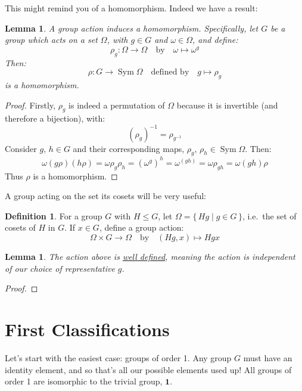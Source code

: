 \documentclass[a4paper, oneside, 12pt, final]{article}
\renewcommand{\emph}{\underline}
\newtheorem{lemma}[theorem]{Lemma}
\theoremstyle{definition}
\newtheorem{definition}[theorem]{Definition}
\DeclareMathOperator{\Sym}{Sym}
\begin{document}
This might remind you of a homomorphism.
Indeed we have a result:

\begin{lemma}\label{lem:actionhom}
    A group action induces a homomorphism.
    Specifically, let \(G\) be a group which acts on a set \(\Omega\), with \(g \in G\) and \(\omega \in \Omega\), and
    define:
    \[\rho_g:\Omega \to \Omega \quad \text{by} \quad \omega \mapsto \omega^g\]
    Then:
    \[\rho:G \to \Sym{\Omega} \quad \text{defined by} \quad g \mapsto \rho_g\]
    is a homomorphism.
\end{lemma}

\begin{proof}
    Firstly, \(\rho_g\) is indeed a permutation of \(\Omega\) because it is invertible (and therefore a bijection),
    with:
    \[{(\rho_g)}^{-1} = \rho_{g^{-1}}\]
    Consider \(g,\,h \in G\) and their corresponding maps, \(\rho_{g},\,\rho_{h} \in \Sym{\Omega}\).
    Then:
    \[\omega(g\rho)(h\rho) = \omega\rho_g\rho_h = {(\omega^g)}^h = \omega^{(gh)} = \omega\rho_{gh} = \omega(gh)\rho\]
    Thus \(\rho\) is a homomorphism.
\end{proof}

A group acting on the set its cosets will be very useful:

\begin{definition}
    For a group \(G\) with \(H \leqslant G\), let \(\Omega = \{\,Hg \mid g \in G\,\}\), i.e.\ the set of cosets of \(H\)
    in \(G\).
    If \(x \in G\), define a group action:
    \[\Omega \times G \to \Omega \quad \text{by} \quad (Hg, x) \mapsto Hgx\]
\end{definition}

\begin{lemma}
    The action above is \emph{well defined}, meaning the action is independent of our choice of representative \(g\).
\end{lemma}

\begin{proof}
\end{proof}


\section{First Classifications}
Let's start with the easiest case: groups of order 1.
Any group \(G\) must have an identity element, and so that's all our possible elements used up!
All groups of order 1 are isomorphic to the trivial group, \(\bm{1}\).
\end{document}
